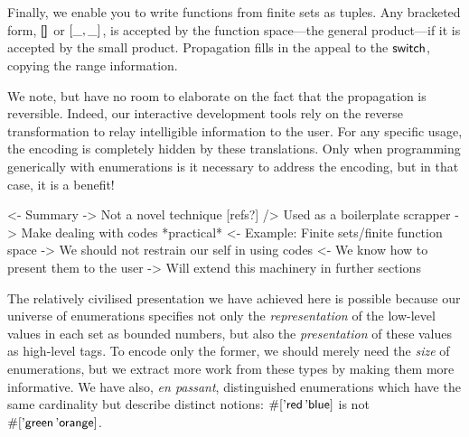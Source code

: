 Finally, we enable you to write functions from finite sets as tuples.
Any bracketed form, \(\void\) or \(\pair{\_}{\_}{}\), is accepted by the
function space---the general product---if it is accepted by the
small product. Propagation fills in the appeal to the $\F{switch}$,
copying the range information.

We note, but have no room to elaborate on the fact that the propagation
is reversible. Indeed, our interactive development tools rely on the
reverse transformation to relay intelligible information to the user.
For any specific usage, the encoding is completely hidden by these
translations. Only when programming generically with enumerations is it
necessary to address the encoding, but in that case, it is a benefit!

\begin{wstructure}
<- Summary
    -> Not a novel technique [refs?]
        /> Used as a boilerplate scrapper
    -> Make dealing with codes *practical*
        <- Example: Finite sets/finite function space
        -> We should not restrain our self in using codes
            <- We know how to present them to the user
-> Will extend this machinery in further sections
\end{wstructure}



The relatively civilised presentation we have achieved here is
possible because our universe of enumerations specifies not only the
\emph{representation} of the low-level values in each set as bounded
numbers, but also the \emph{presentation} of these values as
high-level tags. To encode only the former, we should merely need the
\emph{size} of enumerations, but we extract more work from these types
by making them more informative.  We have also, \emph{en passant},
distinguished enumerations which have the same cardinality but
describe distinct notions:
\(\EnumT{\sqr{\etag{\CN{red}}\,\etag{\CN{blue}}}}\) is not
\(\EnumT{\sqr{\etag{\CN{green}}\,\etag{\CN{orange}}}}\).